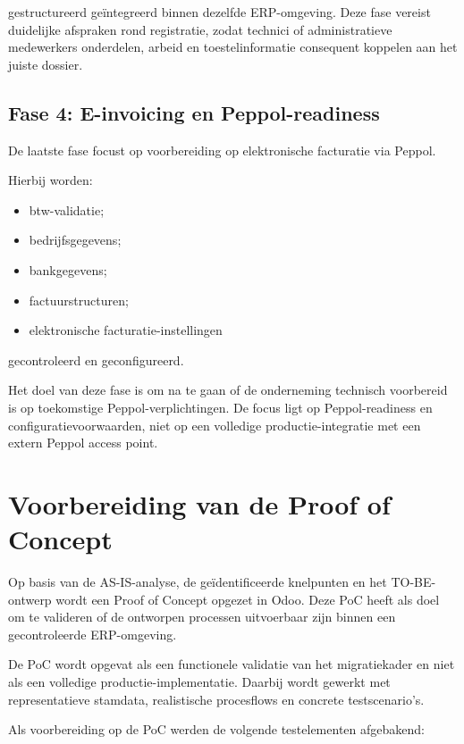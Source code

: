 gestructureerd geïntegreerd binnen dezelfde ERP-omgeving. Deze fase vereist duidelijke afspraken rond registratie, zodat technici of administratieve medewerkers onderdelen, arbeid en toestelinformatie consequent koppelen aan het juiste dossier.

\subsection{Fase 4: E-invoicing en Peppol-readiness}

De laatste fase focust op voorbereiding op elektronische facturatie via Peppol.

Hierbij worden:
\begin{itemize}
    \item btw-validatie;
    \item bedrijfsgegevens;
    \item bankgegevens;
    \item factuurstructuren;
    \item elektronische facturatie-instellingen
\end{itemize}

gecontroleerd en geconfigureerd.

Het doel van deze fase is om na te gaan of de onderneming technisch voorbereid is op toekomstige Peppol-verplichtingen. De focus ligt op Peppol-readiness en configuratievoorwaarden, niet op een volledige productie-integratie met een extern Peppol access point.

\section{Voorbereiding van de Proof of Concept}
\label{sec:voorbereiding-poc}

Op basis van de AS-IS-analyse, de geïdentificeerde knelpunten en het TO-BE-ontwerp wordt een Proof of Concept opgezet in Odoo. Deze PoC heeft als doel om te valideren of de ontworpen processen uitvoerbaar zijn binnen een gecontroleerde ERP-omgeving.

De PoC wordt opgevat als een functionele validatie van het migratiekader en niet als een volledige productie-implementatie. Daarbij wordt gewerkt met representatieve stamdata, realistische procesflows en concrete testscenario’s.

Als voorbereiding op de PoC werden de volgende testelementen afgebakend:

